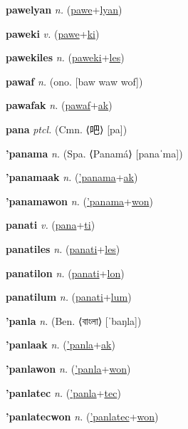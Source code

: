 \textbf{\hypertarget{pawelyan}{pawelyan}} \textit{n.} (\hyperlink{pawe}{pawe}+\allowbreak \hyperlink{lyan}{lyan})


\textbf{\hypertarget{paweki}{paweki}} \textit{v.} (\hyperlink{pawe}{pawe}+\allowbreak \hyperlink{ki}{ki})


\textbf{\hypertarget{pawekiles}{pawekiles}} \textit{n.} (\hyperlink{paweki}{paweki}+\allowbreak \hyperlink{les}{les})


\textbf{\hypertarget{pawaf}{pawaf}} \textit{n.} (ono. [baw waw wof])


\textbf{\hypertarget{pawafak}{pawafak}} \textit{n.} (\hyperlink{pawaf}{pawaf}+\allowbreak \hyperlink{ak}{ak})


\textbf{\hypertarget{pana}{pana}} \textit{ptcl.} (Cmn. ⟨{\chinese{}吧}⟩ [pa])


\textbf{\hypertarget{'panama}{'panama}} \textit{n.} (Spa. ⟨Panamá⟩ [panaˈma])


\textbf{\hypertarget{'panamaak}{'panamaak}} \textit{n.} (\hyperlink{'panama}{'panama}+\allowbreak \hyperlink{ak}{ak})


\textbf{\hypertarget{'panamawon}{'panamawon}} \textit{n.} (\hyperlink{'panama}{'panama}+\allowbreak \hyperlink{won}{won})


\textbf{\hypertarget{panati}{panati}} \textit{v.} (\hyperlink{pana}{pana}+\allowbreak \hyperlink{ti}{ti})


\textbf{\hypertarget{panatiles}{panatiles}} \textit{n.} (\hyperlink{panati}{panati}+\allowbreak \hyperlink{les}{les})


\textbf{\hypertarget{panatilon}{panatilon}} \textit{n.} (\hyperlink{panati}{panati}+\allowbreak \hyperlink{lon}{lon})


\textbf{\hypertarget{panatilum}{panatilum}} \textit{n.} (\hyperlink{panati}{panati}+\allowbreak \hyperlink{lum}{lum})


\textbf{\hypertarget{'panla}{'panla}} \textit{n.} (Ben. ⟨{\bengali{}বাংলা}⟩ [ˈbaŋla])


\textbf{\hypertarget{'panlaak}{'panlaak}} \textit{n.} (\hyperlink{'panla}{'panla}+\allowbreak \hyperlink{ak}{ak})


\textbf{\hypertarget{'panlawon}{'panlawon}} \textit{n.} (\hyperlink{'panla}{'panla}+\allowbreak \hyperlink{won}{won})


\textbf{\hypertarget{'panlatec}{'panlatec}} \textit{n.} (\hyperlink{'panla}{'panla}+\allowbreak \hyperlink{tec}{tec})


\textbf{\hypertarget{'panlatecwon}{'panlatecwon}} \textit{n.} (\hyperlink{'panlatec}{'panlatec}+\allowbreak \hyperlink{won}{won})


